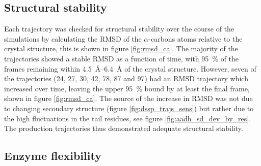 \subsection{Structural stability}

Each trajectory was checked for structural stability over the course of the simulations by calculating the RMSD of the $\alpha$-carbons atoms relative to the crystal structure, this is shown in figure \ref{fig:rmsd_ca}. The majority of the trajectories showed a stable RMSD as a function of time, with \SI{95}{\percent} of the frames remaining within \SIrange{4.5}{6.4}{\angstrom} of the crystal structure. However, seven of the trajectories (24, 27, 30, 42, 78, 87 and 97) had an RMSD trajectory which increased over time, leaving the upper \SI{95}{\percent} bound by at least the final frame, shown in figure \ref{fig:rmsd_ca}. The source of the increase in RMSD was not due to changing secondary structure (figure \ref{fig:dssp_trajs_sens}) but rather due to the high fluctuations in the tail residues, see figure \ref{fig:aadh_sd_dev_by_res}. The production trajectories thus demonstrated adequate structural stability. 

\subsection{Enzyme flexibility}

